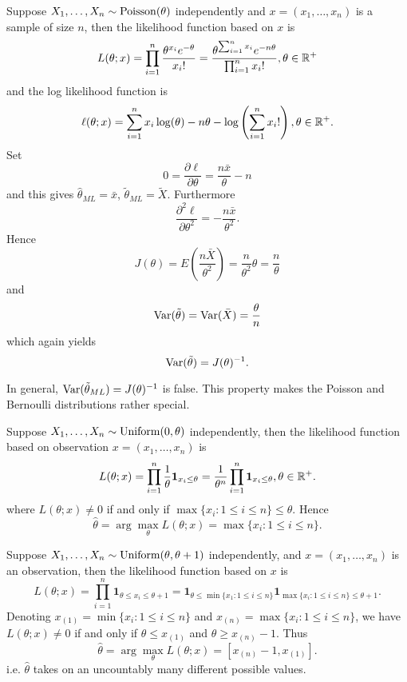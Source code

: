 \documentclass[11pt,fleqn]{book} %
\begin{document}
\begin{example} \label{eg:537}
Suppose \(X_1, \ldots, X_n \sim \operatorname{Poisson}(\theta)\) independently and \(x = (x_1, \ldots, x_n)\) is a sample of size \(n\), then the likelihood function based on \(x\) is
\[
L(\theta; x) = \prod_{i=1}^n \frac{\theta^{x_i}e^{-\theta}}{x_i!} = \frac{\theta^{\sum_{i=1}^n x_i}e^{-n\theta}}{\prod_{i=1}^n x_i!}, \theta \in \mathbb{R}^+
\]
and the log likelihood function is
\[
\ell(\theta; x) = \sum_{i=1}^n x_i\log(\theta) - n\theta - \log\left(\sum_{i=1}^n x_i!\right), \theta \in \mathbb{R}^+.
\]
\indent Set
\[
0 = \frac{\partial\ell}{\partial\theta} = \frac{n\bar{x}}{\theta} - n
\]
and this gives \(\hat{\theta}_{ML} = \bar{x}\), \(\tilde{\theta}_{ML} = \tilde{X}\). Furthermore
\[
\frac{\partial^2\ell}{\partial\theta^2} = -\frac{n\bar{x}}{\theta^2}.
\]
\indent Hence
\[
J(\theta) = E\left(\frac{n\bar{X}}{\theta^2}\right) = \frac{n}{\theta^2}\theta = \frac{n}{\theta}
\]
and
\[
\operatorname{Var}(\tilde{\theta}) = \operatorname{Var}(\bar{X}) = \frac{\theta}{n}
\]
which again yields
\[
\operatorname{Var}(\tilde{\theta}) = J(\theta)^{-1}.
\]
\end{example}

\begin{remark} \label{rmk:538}
In general, \(\operatorname{Var}(\tilde{\theta}_{ML}) = J(\theta)^{-1}\) is false. This property makes the Poisson and Bernoulli distributions rather special.
\end{remark}

\begin{example} \label{eg:539}
Suppose \(X_1, \ldots, X_n \sim \operatorname{Uniform}(0, \theta)\) independently, then the likelihood function based on observation \(x = (x_1, \ldots, x_n)\) is
\[
L(\theta; x) = \prod_{i=1}^n\frac{1}{\theta} \mathbf{1}_{x_i \leq \theta} = \frac{1}{\theta^n}\prod_{i=1}^n \mathbf{1}_{x_i \leq \theta}, \theta \in \mathbb{R}^+.
\]
where \(L(\theta; x) \neq 0\) if and only if \(\max\{x_i: 1 \leq i \leq n\} \leq \theta\). Hence
\[
\hat{\theta} = \arg\max_\theta L(\theta; x) = \max\{x_i: 1 \leq i \leq n\}.
\]
\end{example}

\begin{example} \label{eg:5310}
Suppose \(X_1, \ldots, X_n \sim \operatorname{Uniform}(\theta, \theta + 1)\) independently, and \(x = (x_1, \ldots, x_n)\) is an observation, then the likelihood function based on \(x\) is
\[
L(\theta; x) = \prod_{i=1}^n \mathbf{1}_{\theta \leq x_i \leq \theta + 1} = \mathbf{1}_{\theta \leq \min\{x_1: 1 \leq i \leq n\}}\mathbf{1}_{\max\{x_i: 1 \leq i \leq n\} \leq \theta + 1}.
\]
\indent Denoting \(x_{(1)} = \min\{x_i: 1 \leq i \leq n\}\) and \(x_{(n)} = \max\{x_i: 1 \leq i \leq n\}\), we have \(L(\theta; x) \neq 0\) if and only if \(\theta \leq x_{(1)}\) and \(\theta \geq x_{(n)} - 1\). Thus
\[
\hat{\theta} = \arg\max_\theta L(\theta; x) = [x_{(n)} - 1, x_{(1)}].
\]
i.e. \(\hat{\theta}\) takes on an uncountably many different possible values.
\end{example}
\end{document}
